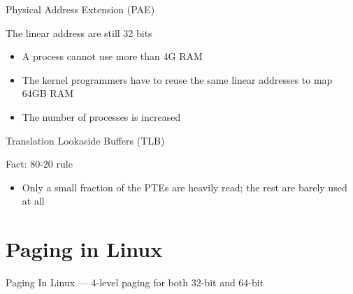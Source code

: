 \begin{frame}{Physical Address Extension (PAE)}
  \begin{block}{The linear address are still 32 bits}
    \begin{itemize}
    \item A process cannot use more than 4G RAM
    \item The kernel programmers have to reuse the same linear addresses to map 64GB RAM
    \item The number of processes is increased
    \end{itemize}
  \end{block}
\end{frame}

\begin{frame}{Translation Lookaside Buffers (TLB)}
    \begin{block}{Fact: 80-20 rule}
    \begin{itemize}
    \item Only a small fraction of the PTEs are heavily read; the rest are barely used at
      all
    \end{itemize}
  \end{block}
  \begin{center}
  \end{center}
\end{frame}

\section{Paging in Linux}
\label{sec:paging-linux}

\begin{frame}{Paging In Linux}{ --- 4-level paging for both 32-bit and 64-bit}
  \begin{center}
  \end{center}
\end{frame}

